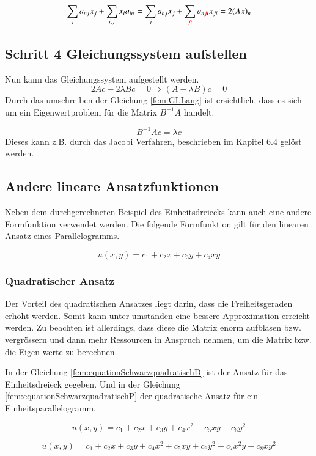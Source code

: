 \begin{equation}
	\sum_{j} a_{nj} x_j + \sum_{i,j} x_i a_{in} = \sum_{j} a_{nj} x_j + \sum_{\textcolor{red}{\not{j}} i} a_{n \textcolor{red}{\not{j}} i} x_{\textcolor{red}{\not{j}} i} = 2(Ax)_n
\end{equation}

\subsection{Schritt 4 Gleichungssystem aufstellen}
Nun kann das Gleichungssystem aufgestellt werden.
\begin{equation}
	2Ac - 2\lambda Bc = 0 \Rightarrow (A-\lambda B)c = 0
	\label{fem:GLLang}
\end{equation}
Durch das umschreiben der Gleichung \ref{fem:GLLang} ist ersichtlich, dass es sich um ein Eigenwertproblem für die Matrix $B^{-1}A$ handelt.

\begin{equation}
		B^{-1}Ac = \lambda c
 \end{equation}
 Dieses kann z.B. durch das Jacobi Verfahren, beschrieben im Kapitel 6.4 gelöst werden.
 
\subsection{Andere lineare Ansatzfunktionen
\label{fem:subsection:Ansatzfunktionen}}

Neben dem durchgerechneten Beispiel des Einheitsdreiecks kann auch eine andere Formfunktion verwendet werden. Die folgende Formfunktion gilt für den linearen Ansatz eines Parallelogramms.

\begin{equation}
	u(x,y) = c_1 + c_2 x + c_3 y + c_4 xy
\end{equation} 


\subsubsection{Quadratischer Ansatz
\label{fem:subsection:bonorum}}

Der Vorteil des quadratischen Ansatzes liegt darin, dass die Freiheitsgeraden erhöht werden. Somit kann unter umständen eine bessere Approximation erreicht werden.
Zu beachten ist allerdings, dass diese die Matrix enorm aufblasen bzw. vergrössern und dann mehr Ressourcen in Anspruch nehmen, um die Matrix bzw. die Eigen werte zu berechnen.

In der Gleichung \ref{fem:equationSchwarzquadratischD}  ist der Ansatz für das Einheitsdreieck gegeben. Und in der Gleichung \ref{fem:equationSchwarzquadratischP} der quadratische Ansatz für ein Einheitsparallelogramm.

\begin{equation}
	u(x,y) = c_1 + c_2 x + c_3 y + c_4 x^2 + c_5 xy + c_6 y^2
	\label{fem:equationSchwarzquadratischD}
\end{equation}

\begin{equation}
	u(x,y) = c_1 + c_2 x + c_3 y + c_4 x^2 + c_5 xy + c_6 y^2 + c_7 x^2y + c_8 xy^2
	\label{fem:equationSchwarzquadratischP}
\end{equation} 



